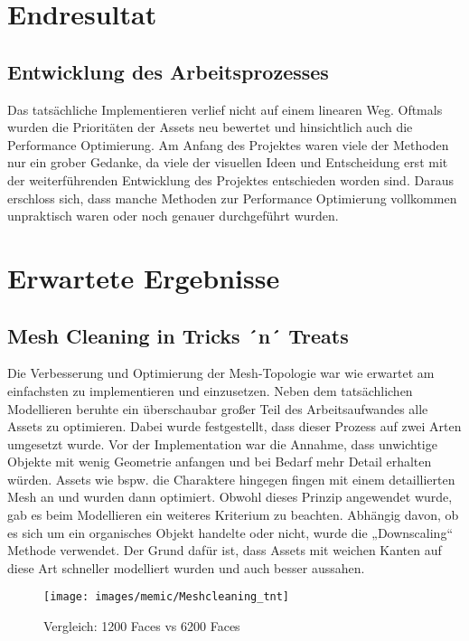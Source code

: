 \section{Endresultat}

\subsection{Entwicklung des Arbeitsprozesses}

Das tatsächliche Implementieren verlief nicht auf einem linearen Weg. Oftmals wurden die Prioritäten der Assets neu bewertet und hinsichtlich auch die Performance Optimierung. Am Anfang des Projektes waren viele der Methoden nur ein grober Gedanke, da viele der visuellen Ideen und Entscheidung erst mit der weiterführenden Entwicklung des Projektes entschieden worden sind.
Daraus erschloss sich, dass manche Methoden zur Performance Optimierung vollkommen unpraktisch waren oder noch genauer durchgeführt wurden.

\section{Erwartete Ergebnisse}

\subsection{Mesh Cleaning in Tricks ´n´ Treats}
Die Verbesserung und Optimierung der Mesh-Topologie war wie erwartet am einfachsten zu implementieren und einzusetzen. Neben dem tatsächlichen Modellieren beruhte ein überschaubar großer Teil des Arbeitsaufwandes alle Assets zu optimieren.
Dabei wurde festgestellt, dass dieser Prozess auf zwei Arten umgesetzt wurde. Vor der Implementation war die Annahme, dass unwichtige Objekte mit wenig Geometrie anfangen und bei Bedarf mehr Detail erhalten würden. Assets wie bspw. die Charaktere hingegen fingen mit einem detaillierten Mesh an und wurden dann optimiert. Obwohl dieses Prinzip angewendet wurde, gab es beim Modellieren ein weiteres Kriterium zu beachten. Abhängig davon, ob es sich um ein organisches Objekt handelte oder nicht, wurde die „Downscaling“ Methode verwendet. Der Grund dafür ist, dass Assets mit weichen Kanten auf diese Art schneller modelliert wurden und auch besser aussahen.

\begin{figure}[H]
	\centering
	\texttt{[image: images/memic/Meshcleaning\_tnt]}
	\caption{Vergleich: 1200 Faces vs 6200 Faces}
\end{figure}

